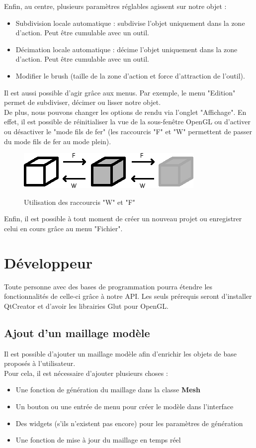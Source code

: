\documentclass[a4paper]{memoir}
\begin{document}
			Enfin, au centre, plusieurs paramètres réglables agissent sur notre objet : 
			\begin{itemize}
				\item Subdivision locale automatique : subdivise l'objet uniquement dans la zone d'action. Peut être cumulable avec un outil.
				\item Décimation locale automatique : décime l'objet uniquement dans la zone d'action. Peut être cumulable avec un outil.
				\item Modifier le brush (taille de la zone d'action et force d'attraction de l'outil).
			\end{itemize}
			Il est aussi possible d'agir grâce aux menus. Par exemple, le menu "Edition" permet de subdiviser, décimer ou lisser notre objet.\\
			De plus, nous pouvons changer les options de rendu via l'onglet "Affichage". En effet, il est possible de réinitialiser la vue de la 
			sous-fenêtre OpenGL ou d'activer ou désactiver le "mode fils de fer" (les raccourcis "F" et "W" permettent de passer du mode fils de fer 
			au mode plein).
			\begin{figure}[H]
				\begin{center}
					\includegraphics[scale=0.8]{img/wire-fill.png}
					\label{fig:wire-fill}
					\caption{Utilisation des raccourcis "W" et "F"}
				\end{center}
			\end{figure}
			Enfin, il est possible à tout moment de créer un nouveau projet ou enregistrer celui en cours grâce au menu "Fichier".

		\section{Développeur}
			Toute personne avec des bases de programmation pourra étendre les fonctionnalités de celle-ci grâce à notre API. Les seuls prérequis seront 
			d'installer QtCreator et d'avoir les librairies Glut pour OpenGL.
			
			\subsection{Ajout d'un maillage modèle}
				Il est possible d'ajouter un maillage modèle afin d'enrichir les objets de base proposés à l'utilisateur.\\
				Pour cela, il est nécessaire d'ajouter plusieurs choses :
				\begin{itemize}
					\item Une fonction de génération du maillage dans la classe \textbf{Mesh}
					\item Un bouton ou une entrée de menu pour créer le modèle dans l'interface
					\item Des widgets (s'ils n'existent pas encore) pour les paramètres de génération
					\item Une fonction de mise à jour du maillage en temps réel
				\end{itemize}
				
\end{document}
